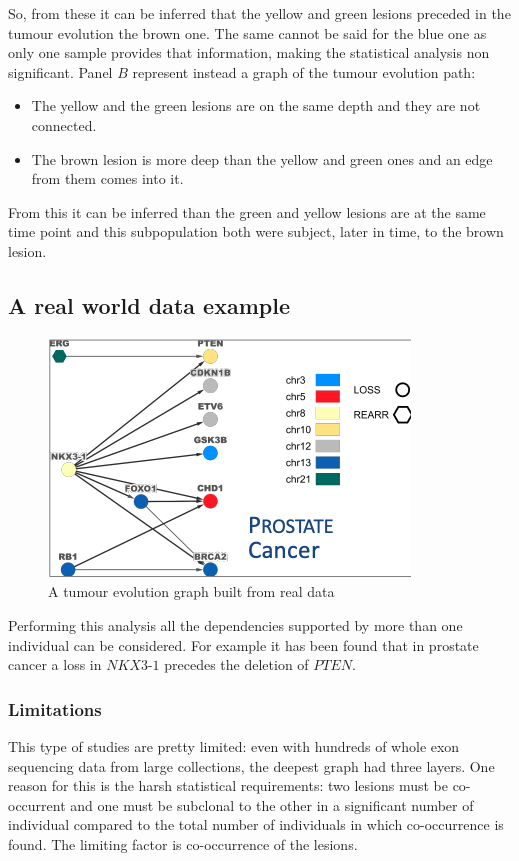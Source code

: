   So, from these it can be inferred that the yellow and green lesions preceded in the tumour evolution the brown one.
  The same cannot be said for the blue one as only one sample provides that information, making the statistical analysis non significant.
  Panel $B$ represent instead a graph of the tumour evolution path:

  \begin{multicols}{2}
    \begin{itemize}
      \item The yellow and the green lesions are on the same depth and they are not connected.
      \item The brown lesion is more deep than the yellow and green ones and an edge from them comes into it.
    \end{itemize}
  \end{multicols}

  From this it can be inferred than the green and yellow lesions are at the same time point and this subpopulation both were subject, later in time, to the brown lesion.

  \subsection{A real world data example}

  \begin{figure}[H]
    \centering
    \includegraphics[width=0.5\linewidth]{image6.png}
    \caption{A tumour evolution graph built from real data}
    \label{fig:real}
  \end{figure}

  Performing this analysis all the dependencies supported by more than one individual can be considered.
  For example it has been found that in prostate cancer a loss in $NKX3$-$1$ precedes the deletion of $PTEN$.

    \subsubsection{Limitations}
    This type of studies are pretty limited: even with hundreds of whole exon sequencing data from large collections, the deepest graph had three layers.
    One reason for this is the harsh statistical requirements: two lesions must be co-occurrent and one must be subclonal to the other in a significant number of individual compared to the total number of individuals in which co-occurrence is found.
    The limiting factor is co-occurrence of the lesions.

